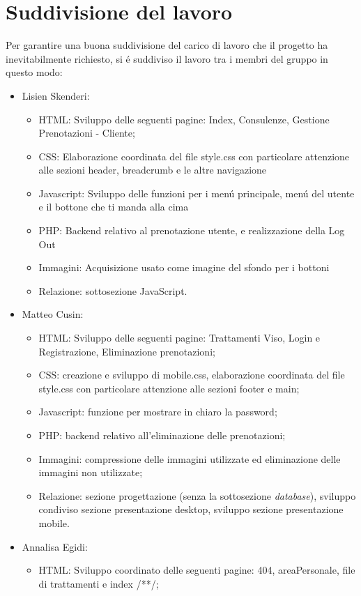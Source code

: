 \documentclass[]{article}
\begin{document}
\section{Suddivisione del lavoro}
Per garantire una buona suddivisione del carico di lavoro che il progetto ha inevitabilmente richiesto, si é suddiviso il lavoro tra i membri del gruppo in questo modo:
\begin{itemize}
	\item Lisien Skenderi: 
	\begin{itemize}
		\item HTML: Sviluppo delle seguenti pagine: Index, Consulenze, Gestione Prenotazioni - Cliente;
		\item CSS:  Elaborazione coordinata del file style.css con particolare attenzione alle sezioni header, breadcrumb e le altre navigazione
		\item Javascript: Sviluppo delle funzioni per i menú principale, menú del utente e il bottone che ti manda alla cima
		\item PHP: Backend relativo al prenotazione utente, e realizzazione della Log Out
		\item Immagini: Acquisizione usato come imagine del sfondo per i bottoni
		\item Relazione: sottosezione JavaScript.
	\end{itemize}
	\item Matteo Cusin:
	\begin{itemize}
		\item HTML: Sviluppo delle seguenti pagine: Trattamenti Viso, Login e Registrazione, Eliminazione prenotazioni;
		\item CSS: creazione e sviluppo di mobile.css, elaborazione coordinata del file style.css con particolare attenzione alle sezioni footer e main;
		\item Javascript: funzione per mostrare in chiaro la password;
		\item PHP: backend relativo all'eliminazione delle prenotazioni;
		\item Immagini: compressione delle immagini utilizzate ed eliminazione delle immagini non utilizzate;
		\item Relazione: sezione progettazione (senza la sottosezione \textit{database}), sviluppo condiviso sezione presentazione desktop, sviluppo sezione presentazione mobile.
	\end{itemize} 
	\item Annalisa Egidi:
	\begin{itemize}
		\item HTML: Sviluppo coordinato delle seguenti pagine: 404, areaPersonale, file di trattamenti e index /**/;

\end{itemize}
\end{itemize}
\end{document}
